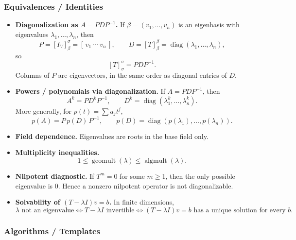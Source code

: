 \subsubsection*{Equivalences / Identities}

\begin{itemize}[leftmargin=*]
\item \textbf{Diagonalization as $A=PDP^{-1}$.} If $\beta=(v_1,\dots,v_n)$ is an eigenbasis with eigenvalues $\lambda_1,\dots,\lambda_n$, then
\[
P=[I_V]^{\sigma}_{\beta}=[\,v_1\ \cdots\ v_n\,],
\qquad
D=[T]^{\beta}_{\beta}=\operatorname{diag}(\lambda_1,\dots,\lambda_n),
\]
so
\[
[T]^{\sigma}_{\sigma}=PDP^{-1}.
\]
Columns of $P$ are eigenvectors, in the same order as diagonal entries of $D$.

\item \textbf{Powers / polynomials via diagonalization.} If $A=PDP^{-1}$, then
\[
A^k=PD^kP^{-1},
\qquad
D^k=\operatorname{diag}(\lambda_1^k,\dots,\lambda_n^k).
\]
More generally, for $p(t)=\sum a_j t^j$,
\[
p(A)=P\,p(D)\,P^{-1},
\qquad
p(D)=\operatorname{diag}(p(\lambda_1),\dots,p(\lambda_n)).
\]

\item \textbf{Field dependence.} Eigenvalues are roots in the base field only.

\item \textbf{Multiplicity inequalities.}
\[
1\le \operatorname{geomult}(\lambda)\le \operatorname{algmult}(\lambda).
\]

\item \textbf{Nilpotent diagnostic.} If $T^m=0$ for some $m\ge 1$, then the only possible eigenvalue is $0$. Hence a nonzero nilpotent operator is not diagonalizable.

\item \textbf{Solvability of $(T-\lambda I)v=b$.} In finite dimensions,
\[
\lambda\text{ not an eigenvalue}
\iff T-\lambda I\text{ invertible}
\iff (T-\lambda I)v=b\text{ has a unique solution for every }b.
\]
\end{itemize}

\subsubsection*{Algorithms / Templates}

